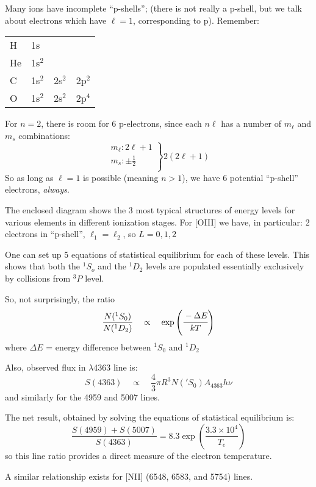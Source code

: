 \documentclass[12pt]{article}
\newcommand{\mar}[1]{\hspace{0pt}\marginpar{-\textcolor{black}{#1}-}}
\begin{document}
Many ions have incomplete ``p-shells''; (there is not really a p-shell,
but we talk about electrons which have $\ell = 1$, corresponding to p).
Remember:

\begin{tabular}{l l l l}
    H & 1s\\
    He & 1s$^{2}$\\
    C & 1s$^{2}$ & 2s$^{2}$ & 2p$^{2}$\\
    O & 1s$^{2}$ & 2s$^{2}$ & 2p$^{4}$
\end{tabular}
For $n=2$, there is room for 6 p-electrons, since each $n\ell$ has
a number of $m_{\ell}$ and $m_{s}$ combinations:
\begin{equation*}
    \left.
        \begin{array}{l}
            m_{\ell}: 2\ell+1\\
            m_{s}: \pm \frac{1}{2}\\
        \end{array}
    \right\}2(2\ell+1)
\end{equation*}
So as long as $\ell=1$ is possible (meaning $n>1$), we have 6 potential
``p-shell'' electrons, \emph{always}.

The enclosed diagram shows the 3 most typical structures of energy
levels for various elements in different ionization stages.
For [OIII] we have, in particular: 2 electrons in ``p-shell'',
$\ell_{1} = \ell_{2}$, so $L = 0, 1, 2$

\mar{81}One can set up 5 equations of statistical equilibrium for each
of these levels. This shows that both the $^{1}S_{o}$ and the
$^{1}D_{2}$ levels are populated essentially exclusively by collisions
from $^{3}P$ level.

So, not surprisingly, the ratio$${
\frac{N(^{1}S_{0})}{N(^{1}D_{2})}\quad\propto\quad
\exp\left(\cfrac{-\Delta{E}}{kT}\right)
}$$
where $\Delta{E}$ = energy difference between
$^{1}S_{0}$ and $^{1}D_{2}$

Also, observed flux in $\lambda$4363 line is:$${
    S(4363) \quad\propto\quad \frac{4}{3}\pi{R^{3}}N('S_{0})A_{4363}h\nu
}$$and similarly for the 4959 and 5007 lines.

The net result, obtained by solving the equations of statistical
equilibrium is:$${
    \frac{S(4959)+S(5007)}{S(4363)} =
    8.3\exp\left(\frac{3.3\times10^{4}}{T_{e}}\right)
}$$so this line ratio provides a direct measure of the electron
temperature.

A similar relationship exists for
[NII] (6548, 6583, and 5754) lines.
\end{document}
